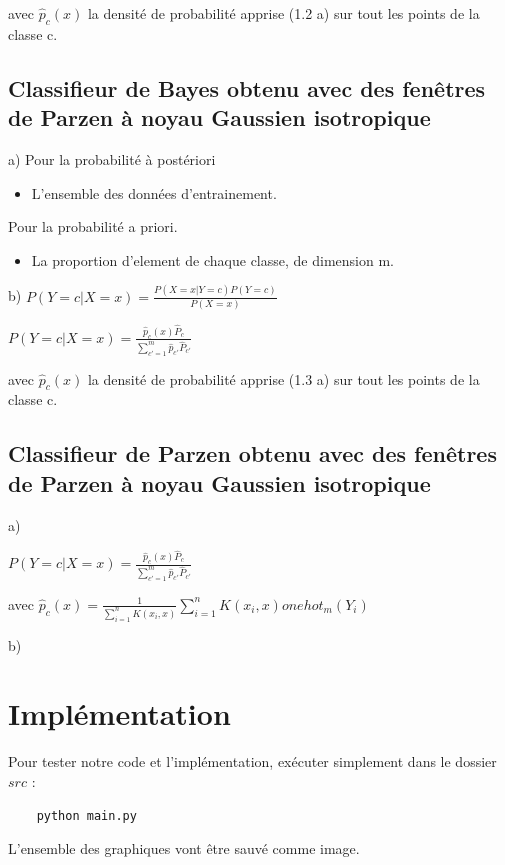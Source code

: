 \documentclass[a4paper,10pt]{article}
\begin{document}
avec $ \hat{p}_{c}(x) $ la densité de probabilité apprise (1.2 a) sur tout les points de la classe c.

\subsection{Classifieur de Bayes obtenu avec des fenêtres de Parzen à noyau Gaussien isotropique}

a) Pour la probabilité à postériori
\begin{itemize}
	\item L'ensemble des données d'entrainement.
\end{itemize}

Pour la probabilité a priori.
\begin{itemize}
	\item La proportion d'element de chaque classe, de dimension m.
\end{itemize}

b) $P(Y=c | X=x)  = \frac{P(X=x | Y=c) P(Y=c)}{P(X=x)} $

$P(Y=c | X=x)  = \frac{ \hat{p}_{c}(x) \hat{P}_{c}}{ \sum_{c'=1}^{m} \hat{p}_{c'} \hat{P}_{c'} } $

avec $ \hat{p}_{c}(x) $ la densité de probabilité apprise (1.3 a) sur tout les points de la classe c.


\subsection{Classifieur de Parzen obtenu avec des fenêtres de Parzen à noyau Gaussien isotropique}

a)

$P(Y=c | X=x)  = \frac{ \hat{p}_{c}(x) \hat{P}_{c}}{ \sum_{c'=1}^{m} \hat{p}_{c'} \hat{P}_{c'} } $

avec $ \hat{p}_{c}(x) =  \frac{1}{ \sum_{i=1}^{n} K(x_{i}, x) } \sum_{i=1}^{n} K(x_{i}, x) onehot_{m}(Y_{i}) $


b)

\section{Implémentation}

Pour tester notre code et l'implémentation, exécuter simplement dans le dossier $src$ :
\begin{verbatim}
	python main.py
\end{verbatim}
L'ensemble des graphiques vont être sauvé comme image.
\end{document}
